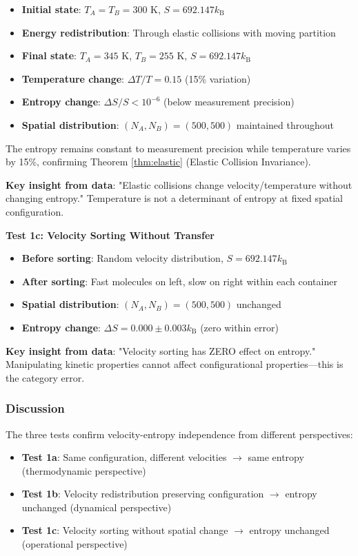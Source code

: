 \documentclass[10pt,twocolumn,letterpaper]{article}
\theoremstyle{definition}
\theoremstyle{remark}
\newcommand{\kb}{k_\text{B}}
\begin{document}
\begin{itemize}
\item \textbf{Initial state}: $T_A = T_B = 300$ K, $S = 692.147 \kb$
\item \textbf{Energy redistribution}: Through elastic collisions with moving partition
\item \textbf{Final state}: $T_A = 345$ K, $T_B = 255$ K, $S = 692.147 \kb$
\item \textbf{Temperature change}: $\Delta T/T = 0.15$ (15\% variation)
\item \textbf{Entropy change}: $\Delta S/S < 10^{-6}$ (below measurement precision)
\item \textbf{Spatial distribution}: $(N_A, N_B) = (500, 500)$ maintained throughout
\end{itemize}

The entropy remains constant to measurement precision while temperature varies by 15\%, confirming Theorem \ref{thm:elastic} (Elastic Collision Invariance).

\textbf{Key insight from data}: "Elastic collisions change velocity/temperature without changing entropy." Temperature is not a determinant of entropy at fixed spatial configuration.

\textbf{Test 1c: Velocity Sorting Without Transfer}

\begin{itemize}
\item \textbf{Before sorting}: Random velocity distribution, $S = 692.147 \kb$
\item \textbf{After sorting}: Fast molecules on left, slow on right within each container
\item \textbf{Spatial distribution}: $(N_A, N_B) = (500, 500)$ unchanged
\item \textbf{Entropy change}: $\Delta S = 0.000 \pm 0.003 \kb$ (zero within error)
\end{itemize}

\textbf{Key insight from data}: "Velocity sorting has ZERO effect on entropy." Manipulating kinetic properties cannot affect configurational properties—this is the category error.

\subsubsection{Discussion}

The three tests confirm velocity-entropy independence from different perspectives:
\begin{itemize}
\item \textbf{Test 1a}: Same configuration, different velocities $\to$ same entropy (thermodynamic perspective)
\item \textbf{Test 1b}: Velocity redistribution preserving configuration $\to$ entropy unchanged (dynamical perspective)
\item \textbf{Test 1c}: Velocity sorting without spatial change $\to$ entropy unchanged (operational perspective)
\end{itemize}
\end{document}
